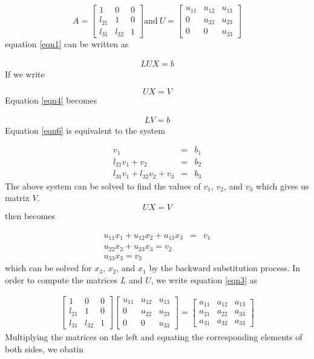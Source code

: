 \documentclass[a4paper, 12pt]{report}
\begin{document}
{\begin{equation*}
A=
\begin{bmatrix} 
1& 0& 0\\
l_{21}& 1& 0\\ 
l_{31}& l_{32}& 1 
\end{bmatrix}
\text{and} \ U=
\begin{bmatrix}
u_{11}& u_{12}& u_{13}\\
0& u_{22}& u_{23}\\
0& 0& u_{33}
\end{bmatrix}
\end{equation*}
equation \eqref{eqn1} can be written as 

\begin{eqnarray} 
LUX=b \label{eqn4}
\end{eqnarray}
If we write

\begin{equation}
UX=V
\end{equation}
Equation \eqref{eqn4} becomes

\begin{eqnarray}
LV=b \label{eqn6}
\end{eqnarray}
Equation \eqref{eqn6} is equivalent to the system

\begin{eqnarray}
v_1&=&b_1 \nonumber\\
l_{21}v_1+v_2&=&b_2 \nonumber\\
l_{31}v_1+l_{32}v_2+v_3&=&b_3
\end{eqnarray} 
The above system can be solved to find the values of $v_1$, $v_2$, and $v_3$ which gives us matrix $V$.
$$UX=V$$
then becomes

\begin{eqnarray}
u_{11}x_1+u_{12}x_2+u_{13}x_3&=&v_1 \nonumber\\
u_{22}x_2+u_{23}x_3=v_2 \nonumber\\
u_{33}x_3=v_3
\end{eqnarray}
which can be solved for $x_3$, $x_2$, and $x_1$ by the backward substitution process. In order to compute the matrices $L$ and $U$, we write equation \eqref{eqn3} as

\begin{eqnarray}
\begin{bmatrix} 
1& 0& 0\\
l_{21}& 1& 0\\ 
l_{31}& l_{32}& 1 
\end{bmatrix}
\begin{bmatrix}
u_{11}& u_{12}& u_{13}\\
0& u_{22}& u_{23}\\
0& 0& u_{33}
\end{bmatrix}
=
\begin{bmatrix} 
a_{11}& a_{12}& a_{13}\\
a_{21}& a_{22}& a_{33}\\ 
a_{31}& a_{32}& a_{33} 
\end{bmatrix}
\end{eqnarray}
Multiplying the matrices on the left and equating the corresponding elements of both sides, we obatin

}
\end{document}
